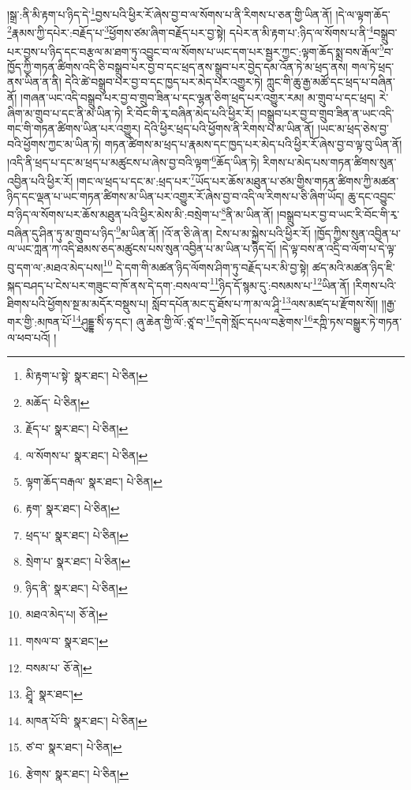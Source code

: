 །སྒྲ་:ནི་མི་རྟག་པ་ཉིད་དེ་\footnote{མི་རྟག་པ་སྟེ་  སྣར་ཐང་།  པེ་ཅིན། }བྱས་པའི་ཕྱིར་རོ་ཞེས་བྱ་བ་ལ་སོགས་པ་ནི་རིགས་པ་ཅན་གྱི་ཡིན་ནོ། །དེ་ལ་ལྟག་ཆོད་\footnote{མཆོད་  པེ་ཅིན། }རྣམས་ཀྱི་དཔེར་:བརྗོད་པ་\footnote{རྗོད་པ་  སྣར་ཐང་།  པེ་ཅིན། }ཕྱོགས་ཙམ་ཞིག་བརྗོད་པར་བྱ་སྟེ། དཔེར་ན་མི་རྟག་པ་:ཉིད་ལ་སོགས་པ་ནི་\footnote{ལ་སོགས་པ་  སྣར་ཐང་།  པེ་ཅིན། }བསྒྲུབ་པར་བྱས་པ་ཉིད་དང་བརྩལ་མ་ཐག་ཏུ་འབྱུང་བ་ལ་སོགས་པ་ཡང་དག་པར་སྦྱར་ཀྱང་:ལྟག་ཆོད་སྨྲ་བས་རྒོལ་\footnote{ལྟག་ཆོད་བརྒལ་  སྣར་ཐང་།  པེ་ཅིན། }བ་ཁྱོད་ཀྱི་གཏན་ཚིགས་འདི་ཅི་བསྒྲུབ་པར་བྱ་བ་དང་ཕྲད་ནས་སྒྲུབ་པར་བྱེད་དམ་འོན་ཏེ་མ་ཕྲད་ནས། གལ་ཏེ་ཕྲད་ནས་ཡིན་ན་ནི། དེའི་ཚེ་བསྒྲུབ་པར་བྱ་བ་དང་ཁྱད་པར་མེད་པར་འགྱུར་ཏེ། ཀླུང་གི་ཆུ་རྒྱ་མཚོ་དང་ཕྲད་པ་བཞིན་ནོ། །གཞན་ཡང་འདི་བསྒྲུབ་པར་བྱ་བ་གྲུབ་ཟིན་པ་དང་ལྷན་ཅིག་ཕྲད་པར་འགྱུར་རམ། མ་གྲུབ་པ་དང་ཕྲད། རེ་ཞིག་མ་གྲུབ་པ་དང་ནི་མ་ཡིན་ཏེ། རི་བོང་གི་རྭ་བཞིན་མེད་པའི་ཕྱིར་རོ། །བསྒྲུབ་པར་བྱ་བ་གྲུབ་ཟིན་ན་ཡང་འདི་གང་གི་གཏན་ཚིགས་ཡིན་པར་འགྱུར། དེའི་ཕྱིར་ཕྲད་པའི་ཕྱོགས་ནི་རིགས་པ་མ་ཡིན་ནོ། །ཡང་མ་ཕྲད་ཅེས་བྱ་བའི་ཕྱོགས་ཀྱང་མ་ཡིན་ཏེ། གཏན་ཚིགས་མ་ཕྲད་པ་རྣམས་དང་ཁྱད་པར་མེད་པའི་ཕྱིར་རོ་ཞེས་བྱ་བ་ལྟ་བུ་ཡིན་ནོ། །འདི་ནི་ཕྲད་པ་དང་མ་ཕྲད་པ་མཚུངས་པ་ཞེས་བྱ་བའི་ལྟག་\footnote{རྟག་  སྣར་ཐང་།  པེ་ཅིན། }ཆོད་ཡིན་ཏེ། རིགས་པ་མེད་པས་གཏན་ཚིགས་སུན་འབྱིན་པའི་ཕྱིར་རོ། །གང་ལ་ཕྲད་པ་དང་མ་:ཕྲད་པར་\footnote{ཕྲད་པ་  སྣར་ཐང་།  པེ་ཅིན། }ཡོད་པར་ཆོས་མཐུན་པ་ཙམ་གྱིས་གཏན་ཚིགས་ཀྱི་མཚན་ཉིད་དང་ལྡན་པ་ཡང་གཏན་ཚིགས་མ་ཡིན་པར་འགྱུར་རོ་ཞེས་བྱ་བ་འདི་ལ་རིགས་པ་ཅི་ཞིག་ཡོད། ཆུ་དང་འབྱུང་བ་ཉིད་ལ་སོགས་པར་ཆོས་མཐུན་པའི་ཕྱིར་མེས་མི་:བསྲེག་པ་\footnote{སྲེག་པ་  སྣར་ཐང་།  པེ་ཅིན། }ནི་མ་ཡིན་ནོ། །བསྒྲུབ་པར་བྱ་བ་ཡང་རི་བོང་གི་རྭ་བཞིན་དུ་ཤིན་ཏུ་མ་གྲུབ་པ་ཉིད་\footnote{ཉིད་ནི་  སྣར་ཐང་།  པེ་ཅིན། }མ་ཡིན་ནོ། །འོ་ན་ཅི་ཞེ་ན། ངེས་པ་མ་སྐྱེས་པའི་ཕྱིར་རོ། །ཁྱོད་ཀྱིས་སུན་འབྱིན་པ་ལ་ཡང་ཀླན་ཀ་འདི་ཐམས་ཅད་མཚུངས་པས་སུན་འབྱིན་པ་མ་ཡིན་པ་ཉིད་དོ། །དེ་ལྟ་བས་ན་འདྲི་བ་ལོག་པ་དེ་ལྟ་བུ་དག་ལ་:མཐའ་མེད་པས།\footnote{མཐའ་མེད་པ།  ཅོ་ནེ། } དེ་དག་གི་མཚན་ཉིད་ལོགས་ཤིག་ཏུ་བརྗོད་པར་མི་བྱ་སྟེ། ཚད་མའི་མཚན་ཉིད་ཇི་སྐད་བཤད་པ་ངེས་པར་གཟུང་བ་ཁོ་ནས་དེ་དག་:བསལ་བ་\footnote{གསལ་བ་  སྣར་ཐང་། }ཉིད་དོ་སྙམ་དུ་:བསམས་པ་\footnote{བསམ་པ་  ཅོ་ནེ། }ཡིན་ནོ། །རིགས་པའི་ཐིགས་པའི་ཕྱོགས་སྔ་མ་མདོར་བསྡུས་པ། སློབ་དཔོན་མང་དུ་ཐོས་པ་ཀ་མ་ལ་ཤཱི་\footnote{ཤྲཱི་  སྣར་ཐང་། }ལས་མཛད་པ་རྫོགས་སོ།། །།རྒྱ་གར་གྱི་:མཁན་པོ་\footnote{མཁན་པོ་བི་  སྣར་ཐང་།  པེ་ཅིན། }ཤུདྡྷ་སིཾ་ཧ་དང་། ཞུ་ཆེན་གྱི་ལོ་:ཙཱ་བ་\footnote{ཙ་བ་  སྣར་ཐང་།  པེ་ཅིན། }དགེ་སློང་དཔལ་བརྩེགས་\footnote{རྩེགས་  སྣར་ཐང་།  པེ་ཅིན། }རཀྵི་ཏས་བསྒྱུར་ཏེ་གཏན་ལ་ཕབ་པའོ། ། 